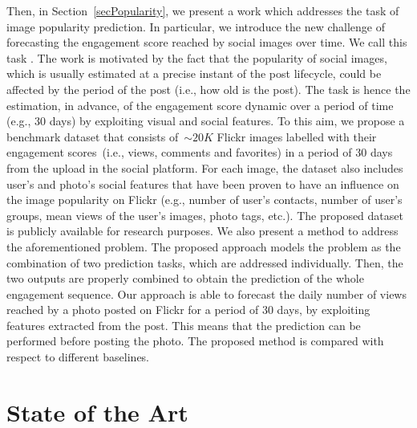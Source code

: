 Then, in Section~\ref{secPopularity}, we present a work which addresses the task of image popularity prediction.
In particular, we introduce the new challenge of forecasting the engagement score reached by social images over time. We call this task . The work is motivated by the fact that the popularity of social images, which is usually estimated at a precise instant of the post lifecycle, could be affected by the period of the post (i.e., how old is the post).
The task is hence the estimation, in advance, of the engagement score dynamic over a period of time (e.g., 30 days) by exploiting visual and social features.
To this aim, we propose a benchmark dataset that consists of~$\sim20K$ Flickr images labelled with their engagement scores~(i.e., views, comments and favorites) in a period of 30 days from the upload in the social platform.
For each image, the dataset also includes user's and photo's social features that have been proven to have an influence on the image popularity on Flickr (e.g., number of user's contacts, number of user's groups, mean views of the user's images, photo tags, etc.). 
The proposed dataset is publicly available for research purposes. We also present a method to address the aforementioned problem. The proposed approach models the problem as the combination of two prediction tasks, which are addressed individually. Then, the two outputs are properly combined to obtain the prediction of the whole engagement sequence. %
Our approach is able to forecast the daily number of views reached by a photo posted on Flickr for a period of 30 days, by exploiting features extracted from the post. This means that the prediction can be performed before posting the photo. 
The proposed method is compared with respect to different baselines. %



\section{State of the Art}\label{csurRelatedWorks}

